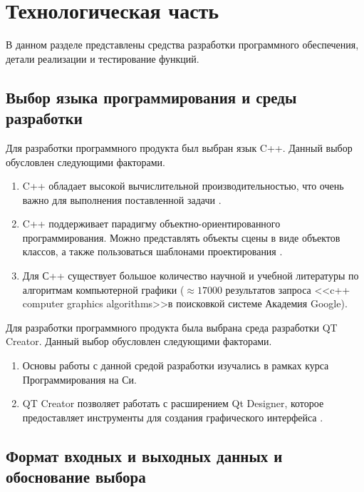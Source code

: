 \chapter{Технологическая часть}

В данном разделе представлены средства разработки программного обеспечения, детали реализации и тестирование функций.

\section{Выбор языка программирования и среды разработки}
Для разработки программного продукта был выбран язык C++.  Данный выбор обусловлен следующими факторами.

\begin{enumerate}[label=\arabic*)]
	\item C++ обладает высокой вычислительной производительностью, что очень важно для выполнения поставленной задачи \cite{cplusplusperfomance}.
	\item C++ поддерживает парадигму объектно-ориентированного программирования. Можно представлять объекты сцены в виде объектов классов, а также пользоваться шаблонами проектирования \cite{isocplusplus}.
	\item Для С++ существует большое количество научной и учебной литературы по алгоритмам компьютерной графики ($\approx17000$ результатов запроса <<c++ computer graphics algorithms>>в поисковкой системе Академия Google).
\end{enumerate}

Для разработки программного продукта была выбрана среда разработки QT Creator. Данный выбор обусловлен следующими факторами.

\begin{enumerate}[label=\arabic*)]
	\item Основы работы с данной средой разработки изучались в рамках курса Программирования на Си.
	\item QT Creator позволяет работать с расширением Qt Designer, которое предоставляет инструменты для создания графического интерфейса \cite{qtdesigner}.
\end{enumerate}

\section{Формат входных и выходных данных и обоснование выбора}

